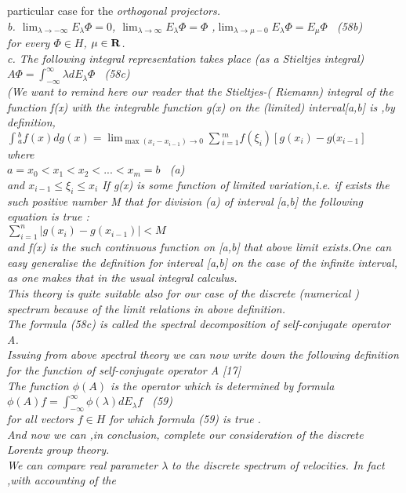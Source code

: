 \documentclass[a4paper,12pt] {article}
\begin{document}
{ particular case for the  \it orthogonal projectors.\rm \\   b. $\lim_ {\lambda \to -\infty} E_\lambda \Phi =0
$,
 $\lim_ {\lambda \to \infty} E_\lambda \Phi =\Phi $ ,$ \lim_ {\lambda \to \mu-0} E_\lambda \Phi =E_\mu\Phi $ \ (58b)\\ for every $ \Phi \in H $, $\mu \in \bf R  $.
\\ c. The following integral representation takes place (as a  {\it Stieltjes integral})
\\ $ A\Phi = \int_ {- \infty}^\infty \lambda d E_{\lambda} \Phi  $ \  (58c)
 \\ (We want to remind here  our reader that the \it  Stieltjes-( Riemann)  integral of the function \rm f(x)
 \it with the integrable function  \rm g(x)  \it on the (limited) interval\rm  [a,b]  \it is ,by definition,\rm
 \\$ \int {_{a} ^{b} f(x) d g(x)} = \lim _{\max (x_i-x_{i-1})\to 0 } \sum {_{i=1} ^m} f( \xi _i )[g(x_i)-g(x_{i-1}] $
\\where
\\ $ a=x_0< x_1<x_2<...< x_m =b $ \ (a) \\ and $ x_{i-1} \le \xi _i \le x_i $ If g(x) is
\it  some function of limited variation,i.e.  \it  if exists the such positive number \rm M  \it that for division \rm (a) \it of interval
 \rm [a,b]  \it the following equation is true \rm  :\\ $ \sum _{i=1} ^n \vert g(x_i)-g(x_{i-1}) \vert <M $
\\and f(x) \it  is the such continuous function  on \rm  [a,b] \it that above limit exists.\rm One can easy
generalise the definition for  interval  [a,b] on the case \it of the infinite interval, \rm as one makes that in
the usual integral calculus.\\ This theory is quite suitable also for our case of the discrete (\it numerical \rm )
spectrum because of the  limit relations in above definition.\\
The formula (58c) is called the {\it spectral decomposition of self-conjugate operator} A.\\Issuing from
above spectral theory we can now write down the following  definition for the \it function of
 self-conjugate operator \rm A [17] \\ \it  The  function $ \phi (A)$   \it is the operator which is
determined by formula \rm  \\$  \phi (A) f= \int _{-\infty}^ {\infty} \phi (\lambda)dE _\lambda f $ \ (59)
\\ \it  for all vectors $ f \in H $  \it for which formula \rm  (59)  \it is true .\\  \rm And now we can ,in
conclusion, complete our consideration of the discrete Lorentz group theory.\\ We can  \it  compare real
parameter  $ \lambda$ }  \it  to the discrete  spectrum of velocities. \rm In fact ,with accounting of the
\end{document}
